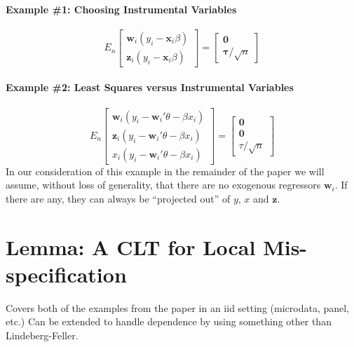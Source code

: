 \documentclass[12pt]{article}\usepackage[]{graphicx}\usepackage[]{color}
\theoremstyle{definition}
\begin{document}
\paragraph{Example \#1: Choosing Instrumental Variables}
 \begin{equation}
  E_n\left[\begin{array}{c}
    \mathbf{w}_i(y_i - \mathbf{x}_i \beta)\\
     \mathbf{z}_i(y_i - \mathbf{x}_i \beta)
  \end{array} \right] = \left[ \begin{array}{c}\mathbf{0} \\ \boldsymbol{\tau}/\sqrt{n} \end{array}\right] 
 \end{equation}
 
 \paragraph{Example \#2: Least Squares versus Instrumental Variables}
\begin{equation}
    E_n\left[\begin{array}{c}
    \mathbf{w}_i(y_i - \mathbf{w}_i' \theta  - \beta x_i)\\
    \mathbf{z}_i(y_i - \mathbf{w}_i' \theta  - \beta x_i)\\
    x_i(y_i - \mathbf{w}_i' \theta  - \beta x_i)
    \end{array}\right] = \left[\begin{array}{c} \mathbf{0} \\ \mathbf{0} \\ \tau/\sqrt{n}  \end{array} \right]
\end{equation}
In our consideration of this example in the remainder of the paper we will assume, without loss of generality, that there are no exogenous regressors $\mathbf{w}_i$. If there are any, they can always be ``projected out'' of $y$, $x$ and $\mathbf{z}$.

\section{Lemma: A CLT for Local Mis-specification}
Covers both of the examples from the paper in an iid setting (microdata, panel, etc.) Can be extended to handle dependence by using something other than Lindeberg-Feller.
\end{document}
